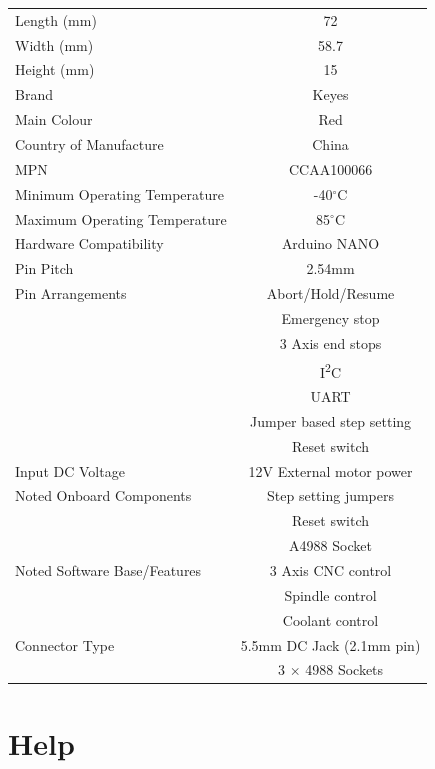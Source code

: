 \begin{center}
\begin{tabular}{lc}
  Length (mm) &  72 \\
  Width (mm)  & 58.7 \\
  Height (mm) & 15\\
  Brand       & Keyes \\
  Main Colour & Red \\
  Country of Manufacture & China \\
  MPN                    & CCAA100066 \\
  Minimum Operating Temperature & -40$^\circ$C \\
  Maximum Operating Temperature &  85$^\circ$C \\
  Hardware Compatibility        & Arduino NANO \\
  Pin Pitch                     & 2.54mm \\
  Pin Arrangements              & Abort/Hold/Resume \\
                                & Emergency stop\\
                                & 3 Axis end stops \\
                                & I\textsuperscript{2}C \\
                                & UART \\
                                & Jumper based step setting \\
                                & Reset switch\\
  Input DC Voltage              & 12V External motor power \\
  Noted Onboard Components      & Step setting jumpers \\
                                & Reset switch \\
                                & A4988 Socket \\
  Noted Software Base/Features  & 3 Axis CNC control \\
                                & Spindle control \\
                                & Coolant control \\
  Connector Type                & 5.5mm DC Jack (2.1mm pin) \\
                                & 3 $\times$  4988 Sockets \\
\end{tabular}
\end{center}  

\section{Help}


